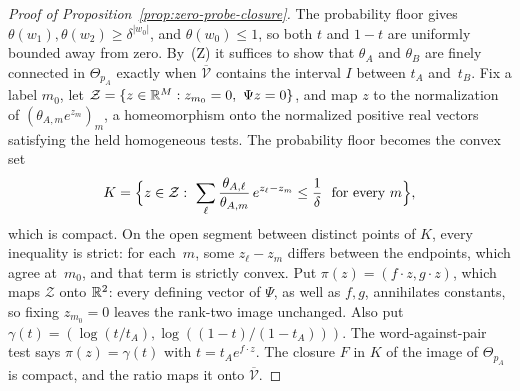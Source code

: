 \begin{proof}[Proof of Proposition~\ref{prop:zero-probe-closure}]
The probability floor gives $\theta(w_1),\theta(w_2)\ge\delta^{|w_0|}$,
and $\theta(w_0)\le1$, so both $t$ and $1-t$ are uniformly bounded away
from zero. By~(Z) it suffices to show that $\theta_A$ and $\theta_B$ are
finely connected in $\Theta_{p_A}$ exactly when $\overline{\mathcal V}$
contains the interval $I$ between $t_A$ and~$t_B$. Fix a label $m_0$, let
$\mathcal Z=\{z\in\mathbb{R}^M:z_{m_0}=0,\ \Psi z=0\}$, and map $z$ to the
normalization of $(\theta_{A,m}e^{z_m})_m$, a homeomorphism onto the
normalized positive real vectors satisfying the held homogeneous tests. The
probability floor becomes the convex set
\[
  K=\Bigl\{z\in\mathcal Z:\ \sum_\ell\frac{\theta_{A,\ell}}{\theta_{A,m}}\,e^{z_\ell-z_m}\le\frac1\delta\ \text{ for every }m\Bigr\},
\]
which is compact. On the open segment between distinct points of $K$,
every inequality is strict: for each~$m$, some $z_\ell-z_m$ differs
between the endpoints, which agree at~$m_0$, and that term is strictly
convex. Put $\pi(z)=(f\cdot z,g\cdot z)$, which maps $\mathcal Z$ onto
$\mathbb{R}^2$: every defining vector of $\Psi$, as well as $f,g$, annihilates
constants, so fixing $z_{m_0}=0$ leaves the rank-two image unchanged. Also
put $\gamma(t)=(\log(t/t_A),\log((1-t)/(1-t_A)))$. The
word-against-pair test says $\pi(z)=\gamma(t)$ with $t=t_Ae^{f\cdot z}$. The
closure $F$ in $K$ of the image of $\Theta_{p_A}$ is compact, and the
ratio maps it onto $\overline{\mathcal V}$.


\end{proof}
